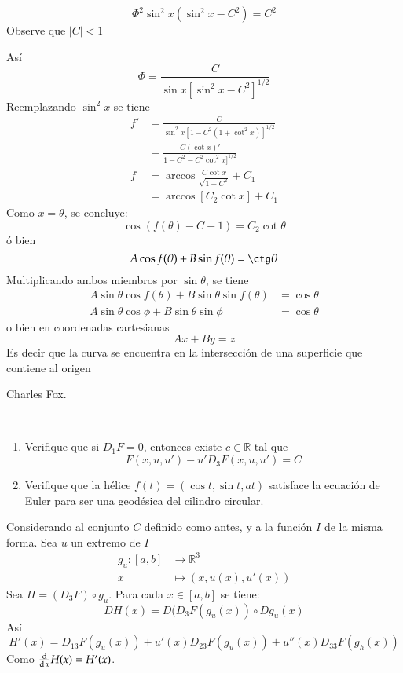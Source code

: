 \[
  \Phi^2 \sin^2x (\sin^2 x - C^2) = C^2
\]
Observe que $|C|<1$

Así
\[
  \Phi = \frac{C}{\sin x [\sin^2 x - C^2]^{1/2}}
\]
Reemplazando $\sin^2 x$ se tiene
\begin{align*}
  f' &= \frac{C}{\sin^2x[1-C^2(1+ \cot^2x)]^{1/2}} \\
     &= \frac{C(\cot x)'}{1-C^2 - C^2\cot^2 x]^{1/2}} \\
  f  &= \arccos \frac{C\cot x}{\sqrt{1-C^2}} + C_1  \\
  &= \arccos[ C_2 \cot x] +C_1   
\end{align*}
Como $x=\theta$, se concluye:
\[
  \cos(f(\theta) - C-1) =  C_2 \cot \theta
\]
ó bien
\[
  A\cos f(\theta) + B \sin f(\theta) =  \ctg \theta
\]
Multiplicando ambos miembros por $\sin \theta$, se tiene
\begin{align*}
  A\sin\theta \cos f(\theta) + B \sin \theta \sin f(\theta) &= \cos \theta \\
  A\sin\theta \cos \phi + B \sin\theta\sin\phi &= \cos \theta 
\end{align*}
o bien en coordenadas cartesianas
\[
  Ax + By = z
\]
Es decir que la curva se encuentra en la intersección de una superficie que
contiene al origen

Charles Fox. 

\begin{problem}
  ~\begin{enumerate}
    \item Verifique que si $D_1F = 0$, entonces existe $c \in \mathbb{R}$ tal que
      \[
        F(x,u,u') - u' D_3F(x,u,u') =C
      \]
    \item Verifique que la hélice $f(t) = (\cos t, \sin t, at)$ satisface la
      ecuación de Euler para ser una geodésica del cilindro circular. 

  \end{enumerate}

\end{problem}


Considerando al conjunto $C$ definido como antes, y a la función $I$ de la misma
forma.
Sea $u$ un extremo de $I$
\begin{align*}
  g_u : [a,b] &\to \mathbb{R}^3 \\
  x &\mapsto (x,u(x),u'(x))
\end{align*}
Sea $H = (D_3F)\circ g_u$. Para cada $x \in [a,b]$ se tiene:
\[
  DH(x) = D (D_3F(g_u(x)) \circ D g_u(x)
\]
Así 
\[  
  H'(x) = D_{13}F(g_u(x)) + u'(x)D_{23}F(g_u(x)) + u''(x)D_{33}F(g_h(x))
\]
Como $\frac{\operatorname{d}}{\operatorname{d} x} H(x) = H'(x)$.

